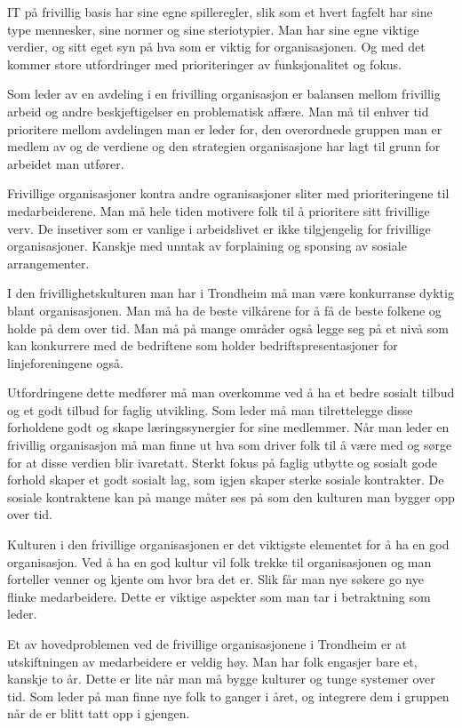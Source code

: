 \documentclass[12pt, a4paper]{article}
\begin{document}
IT på frivillig basis har sine egne spilleregler, slik som et hvert fagfelt har
sine type mennesker, sine normer og sine steriotypier. Man har sine egne
viktige verdier, og sitt eget syn på hva som er viktig for organisasjonen. Og
med det kommer store utfordringer med prioriteringer av funksjonalitet og
fokus.    

Som leder av en avdeling i en frivilling organisasjon er balansen mellom
frivillig arbeid og andre beskjeftigelser en problematisk affære. Man må til
enhver tid prioritere mellom avdelingen man er leder for, den overordnede
gruppen man er medlem av og de verdiene og den strategien organisasjone har
lagt til grunn for arbeidet man utfører. 

Frivillige organisasjoner kontra andre ogranisasjoner sliter med
prioriteringene til medarbeiderene. Man må hele tiden motivere folk til å
prioritere sitt frivillige verv. De insetiver som er vanlige i arbeidslivet er
ikke tilgjengelig for frivillige organisasjoner. Kanskje med unntak av
forplaining og sponsing av sosiale arrangementer. 

I den frivillighetskulturen man har i Trondheim må man være konkurranse dyktig
blant organisasjonen. Man må ha de beste vilkårene for å få de beste folkene og
holde på dem over tid. Man må på mange områder også legge seg på et nivå som
kan konkurrere med de bedriftene som holder bedriftspresentasjoner for
linjeforeningene også. 

Utfordringene dette medfører må man overkomme ved å ha
et bedre sosialt tilbud og et godt tilbud for faglig utvikling. Som leder må
man tilrettelegge disse forholdene godt og skape læringssynergier for sine
medlemmer. Når man leder en frivillig organisasjon må man finne ut hva som
driver folk til å være med og sørge for at disse verdien blir ivaretatt. Sterkt
fokus på faglig utbytte og sosialt gode forhold skaper et godt sosialt lag, som
igjen skaper sterke sosiale kontrakter. De sosiale kontraktene kan på mange
måter ses på som den kulturen man bygger opp over tid. 

Kulturen i den frivillige organisasjonen er det viktigste elementet for å ha en
god organisasjon. Ved å ha en god kultur vil folk trekke til organisasjonen og
man forteller venner og kjente om hvor bra det er. Slik får man nye søkere go
nye flinke medarbeidere. Dette er viktige aspekter som man tar i betraktning
som leder. 

Et av hovedproblemen ved de frivillige organisasjonene i Trondheim er at
utskiftningen av medarbeidere er veldig høy. Man har folk engasjer bare et,
kanskje to år. Dette er lite når man må bygge kulturer og tunge systemer over
tid. Som leder på man finne nye folk to ganger i året, og integrere dem i
gruppen når de er blitt tatt opp i gjengen. 
\end{document}
